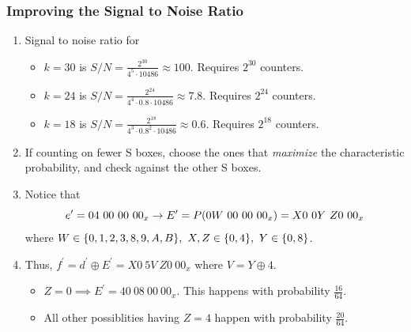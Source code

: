 \documentclass{beamer}
\begin{document}
    \begin{frame}
        \frametitle{Improving the Signal to Noise Ratio}
        \begin{enumerate}
            \item<1-> Signal to noise ratio for
            \begin{itemize}
                \item \(k = 30\) is \(S/N = \frac{2^{30}}{4^5 \cdot 10486}
                \approx 100\). Requires \(2^{30}\) counters.
                \item \(k = 24\) is \(S/N = \frac{2^{24}}{4^4 \cdot 0.8 \cdot
                10486} \approx 7.8\). Requires \(2^{24}\) counters.
                \item \(k = 18\) is \(S/N = \frac{2^{18}}{4^3 \cdot 0.8^2 \cdot
                10486} \approx 0.6\). Requires \(2^{18}\) counters.
            \end{itemize}
            \item<3-> If counting on fewer S boxes, choose the ones that
            \emph{maximize} the characteristic probability, and check against
            the other S boxes.
            \item<4-> Notice that
            \begin{equation}
                e^\prime = 04\ 00\ 00\ 00_x \rightarrow E^\prime = P\brak{0W\ 00\ 00\ 00_x} = X0\ 0Y\ Z0\ 00_x
                \label{eq:des-8rd-e-E}
            \end{equation}
            where \(W \in \{0,1,2,3,8,9,A,B\},\ X,Z \in \{0,4\},\ Y \in
            \{0,8\}\).
            \item<5-> Thus, \(f^\prime = d^\prime \oplus E^\prime = X0\ 5V\ Z0\
            00_x\) where \(V = Y \oplus 4\).
            \begin{itemize}
                \item \(Z = 0 \implies E^\prime = 40\ 08\ 00\ 00_x\). This
                happens with probability \(\frac{16}{64}\).
                \item All other possiblities having \(Z = 4\) happen with
                probability \(\frac{20}{64}\).
            \end{itemize}
        \end{enumerate}
    \end{frame}
\end{document}
